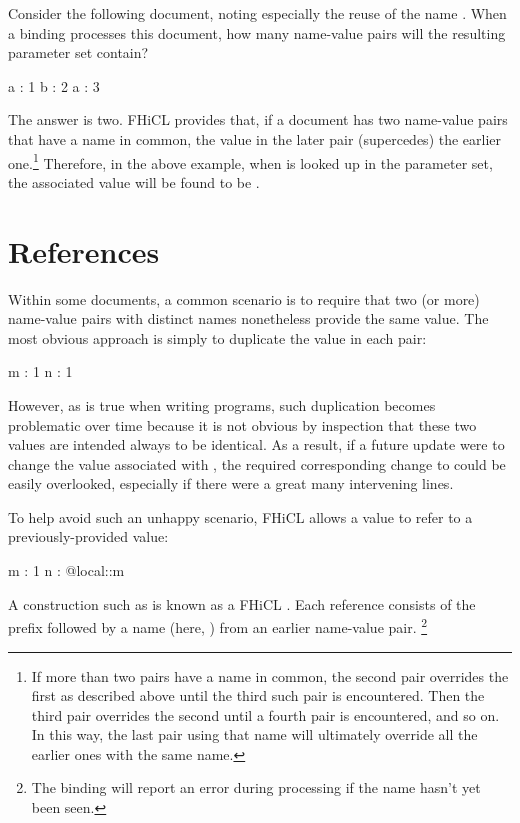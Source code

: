 \documentclass[draftmode,draftwater]{memarticle}
\newcommand{\fhicl}%
 {FHiCL\xspace}
\begin{document}
Consider the following document, noting especially the reuse of the
name .  When a binding processes this document, how many
name-value pairs will the resulting parameter set contain?
%
\Needspace{0.5in}
\begin{fcllisting}[texcl,escapechar=`]
a : 1
b : 2
a : 3
\end{fcllisting}
%
The answer is two.  \fhicl provides that, if a document has two
name-value pairs that have a name in common, the value in the later
pair  (supercedes) the earlier one.\footnote{%
  If more than two pairs have a name in common, the second pair
  overrides the first as described above until the third such pair is
  encountered.  Then the third pair overrides the second until a
  fourth pair is encountered, and so on.  In this way, the last pair
  using that name will ultimately override all the earlier ones with
  the same name.%
} Therefore, in the above example, when  is looked up in
the parameter set, the associated value will be found to be
.

\section{References}

Within some documents, a common scenario is to require that two (or
more) name-value pairs with distinct names nonetheless provide the
same value.  The most obvious approach is simply to duplicate the
value in each pair:
%
\Needspace{0.34in}
\begin{fcllisting}[texcl,escapechar=`]
m : 1
n : 1
\end{fcllisting}
%
However, as is true when writing programs, such duplication becomes
problematic over time because it is not obvious by inspection that
these two values are intended always to be identical.  As a result, if
a future update were to change the value associated with ,
the required corresponding change to  could be easily
overlooked, especially if there were a great many intervening lines.

To help avoid such an unhappy scenario, \fhicl allows a value to refer
to a previously-provided value: 
%
\Needspace{0.34in}
\begin{fcllisting}[texcl,escapechar=`]
m : 1
n : @local::m
\end{fcllisting}
%
A construction such as  is known as a \fhicl
{}.  Each reference consists of the prefix
 followed by a name (here, ) from an
earlier name-value pair.%
\footnote{%
  The binding will report an error during processing if the name
  hasn't yet been seen.%
}
\end{document}
